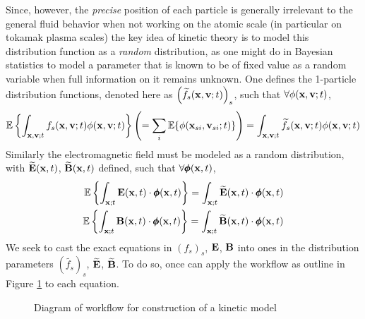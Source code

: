     Since, however, the \emph{precise} position of each particle is generally irrelevant to the general fluid behavior when not working on the atomic scale (in particular on tokamak plasma scales) the key idea of kinetic theory is to model this distribution function as a \emph{random} distribution, as one might do in Bayesian statistics to model a parameter that is known to be of fixed value as a random variable when full information on it remains unknown. One defines the 1-particle distribution functions, denoted here as $\left(\widetilde{f_{s}}(\mathbf{x}, \mathbf{v}; t)\right)_{s}$, such that $\forall \phi(\mathbf{x}, \mathbf{v}; t)$,
    \begin{equation}
        \mathbb{E}\left\{\int_{\mathbf{x}, \mathbf{v}; t}f_{s}(\mathbf{x}, \mathbf{v}; t)\phi(\mathbf{x}, \mathbf{v}; t)\right\}
        \left(=  \sum_{i}\mathbb{E}\{\phi(\mathbf{x}_{si}, \mathbf{v}_{si}; t)\}\right)
        =  \int_{\mathbf{x}, \mathbf{v}; t}\widetilde{f_{s}}(\mathbf{x}, \mathbf{v}; t)\phi(\mathbf{x}, \mathbf{v};t )
    \end{equation}
    Similarly the electromagnetic field must be modeled as a random distribution, with $\widetilde{\mathbf{E}}(\mathbf{x}, t)$, $\widetilde{\mathbf{B}}(\mathbf{x}, t)$ defined, such that $\forall \pmb{\mathsf{\phi}}(\mathbf{x}, t)$,
    \begin{align}
        \mathbb{E}\left\{\int_{\mathbf{x}; t}\mathbf{E}(\mathbf{x}, t)\cdot\pmb{\mathsf{\phi}}(\mathbf{x}, t)\right\}  =  \int_{\mathbf{x}; t}\widetilde{\mathbf{E}}(\mathbf{x}, t)\cdot\pmb{\mathsf{\phi}}(\mathbf{x}, t)  \\ 
        \mathbb{E}\left\{\int_{\mathbf{x}; t}\mathbf{B}(\mathbf{x}, t)\cdot\pmb{\mathsf{\phi}}(\mathbf{x}, t)\right\}  =  \int_{\mathbf{x}; t}\widetilde{\mathbf{B}}(\mathbf{x}, t)\cdot\pmb{\mathsf{\phi}}(\mathbf{x}, t)
    \end{align}
    We seek to cast the exact equations in $(f_{s})_{s}$, $\mathbf{E}$, $\mathbf{B}$ into ones in the distribution parameters $\left(\widetilde{f_{s}}\right)_{s}$, $\widetilde{\mathbf{E}}$, $\widetilde{\mathbf{B}}$. To do so, once can apply the workflow as outline in Figure \ref{fig:kinetic model construction workflow} to each equation.
    \begin{figure}[!h]
        \centering
        \caption{Diagram of workflow for construction of a kinetic model}
        \label{fig:kinetic model construction workflow}
    \end{figure}

